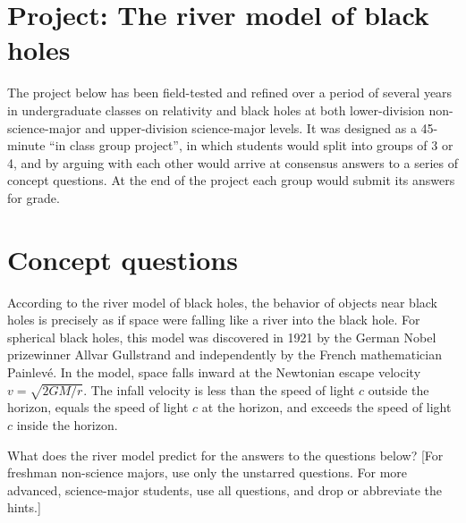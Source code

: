 \documentclass[twocolumn,showpacs,preprintnumbers,amsmath,amssymb,prb]{revtex4}
\begin{document}
\appendix
\section{Project: The river model of black holes}

The project below
has been field-tested and refined over a period of several years
in undergraduate classes on relativity and black holes
at both lower-division non-science-major
and upper-division science-major levels.
It was designed as a 45-minute ``in class group project'',
in which students would split into groups of 3 or 4,
and by arguing with each other would
arrive at consensus answers to a series of concept questions.
At the end of the project each group would submit its answers for grade.

\section*{Concept questions}

According to the river model of black holes, the behavior of
objects near black holes is precisely as if space were falling
like a river into the black hole.
For spherical black holes, this
model was discovered in 1921
by the German Nobel prizewinner Allvar Gullstrand
and independently by the French mathematician Painlev\'e.
In the model, space falls inward at the Newtonian escape velocity
$v = \sqrt{2 G M / r}$.
The infall velocity is less than the speed of light $c$ outside the horizon,
equals the speed of light $c$ at the horizon,
and exceeds the speed of light $c$ inside the horizon.

What does the river model predict for the answers to the
questions below?
[For freshman non-science majors,
use only the unstarred questions.
For more advanced, science-major students,
use all questions, and drop or abbreviate the hints.]
\end{document}
